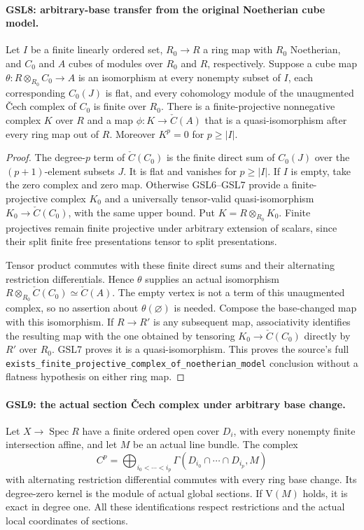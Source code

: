 \paragraph{GSL8: arbitrary-base transfer from the original Noetherian cube model.}
\label{claim:GSL8}
Let $I$ be a finite linearly ordered set, $R_0\to R$ a ring map
with $R_0$ Noetherian, and $C_0$ and $A$ cubes of modules over
$R_0$ and $R$, respectively.  Suppose a cube map
$\theta:R\otimes_{R_0}C_0\to A$ is an isomorphism at every
nonempty subset of $I$, each corresponding $C_0(J)$ is flat,
and every cohomology module of the unaugmented \v Cech complex
of $C_0$ is finite over $R_0$.  There is a finite-projective
nonnegative complex $K$ over $R$ and a map
$\phi:K\to\check C(A)$ that is a quasi-isomorphism after every
ring map out of $R$.  Moreover $K^p=0$ for $p\ge |I|$.

\begin{proof}
The degree-$p$ term of $\check C(C_0)$ is the finite direct sum of
$C_0(J)$ over the $(p+1)$-element subsets $J$.  It is flat and
vanishes for $p\ge |I|$.  If $I$ is empty, take the zero complex
and zero map.  Otherwise GSL6--GSL7 provide a finite-projective
complex $K_0$ and a universally tensor-valid quasi-isomorphism
$K_0\to\check C(C_0)$, with the same upper bound.  Put
$K=R\otimes_{R_0}K_0$.  Finite projectives remain finite
projective under arbitrary extension of scalars, since their split
finite free presentations tensor to split presentations.

Tensor product commutes with these finite direct sums and their
alternating restriction differentials.  Hence $\theta$ supplies
an actual isomorphism
$R\otimes_{R_0}\check C(C_0)\simeq\check C(A)$.  The empty
vertex is not a term of this unaugmented complex, so no assertion
about $\theta(\varnothing)$ is needed.  Compose the base-changed
map with this isomorphism.  If $R\to R'$ is any subsequent map,
associativity identifies the resulting map with the one obtained by
tensoring $K_0\to\check C(C_0)$ directly by $R'$ over $R_0$.
GSL7 proves it is a quasi-isomorphism.  This proves the source's
full \texttt{exists\_finite\_projective\_complex\_of\_noetherian\_model}
conclusion without a flatness hypothesis on either ring map.
\end{proof}

\paragraph{GSL9: the actual section \v Cech complex under arbitrary base change.}
\label{claim:GSL9}
Let $X\to\operatorname{Spec}R$ have a finite ordered open cover
$D_i$, with every nonempty finite intersection affine, and let $M$
be an actual line bundle.  The complex
\[
 C^p=\bigoplus_{i_0<\cdots<i_p}
       \Gamma(D_{i_0}\cap\cdots\cap D_{i_p},M)
 \tag{GSL.5}
\]
with alternating restriction differential commutes with every ring
base change.  Its degree-zero kernel is the module of actual global
sections.  If $\mathrm V(M)$ holds, it is exact in degree one.
All these identifications respect restrictions and the actual local
coordinates of sections.

